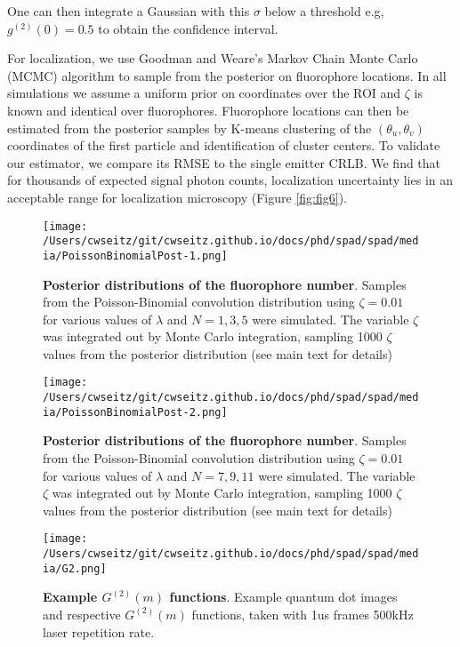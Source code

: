 One can then integrate a Gaussian with this $\sigma$ below a threshold e.g, $g^{(2)}(0)=0.5$ to obtain the confidence interval.

For localization, we use Goodman and Weare's Markov Chain Monte Carlo (MCMC) algorithm \parencite{Goodman2010} to sample from the posterior on fluorophore locations. In all simulations we assume a uniform prior on coordinates over the ROI and $\zeta$ is known and identical over fluorophores. Fluorophore locations can then be estimated from the posterior samples by K-means clustering of the $(\theta_u,\theta_v)$ coordinates of the first particle and identification of cluster centers. To validate our estimator, we compare its RMSE to the single emitter CRLB. We find that for thousands of expected signal photon counts, localization uncertainty lies in an acceptable range for localization microscopy (Figure \ref{fig:fig6}).

\begin{figure*}[t]
\centering
\texttt{[image: /Users/cwseitz/git/cwseitz.github.io/docs/phd/spad/spad/media/PoissonBinomialPost-1.png]}
\caption{\textbf{Posterior distributions of the fluorophore number}. Samples from the Poisson-Binomial convolution distribution using $\zeta=0.01$ for various values of $\lambda$ and $N=1,3,5$ were simulated. The variable $\zeta$ was integrated out by Monte Carlo integration, sampling 1000 $\zeta$ values from the posterior distribution (see main text for details)}
\label{fig:fig9}
\end{figure*}    

\begin{figure*}[t]
\centering
\texttt{[image: /Users/cwseitz/git/cwseitz.github.io/docs/phd/spad/spad/media/PoissonBinomialPost-2.png]}
\caption{\textbf{Posterior distributions of the fluorophore number}. Samples from the Poisson-Binomial convolution distribution using $\zeta=0.01$ for various values of $\lambda$ and $N=7,9,11$ were simulated. The variable $\zeta$ was integrated out by Monte Carlo integration, sampling 1000 $\zeta$ values from the posterior distribution (see main text for details)}
\label{fig:fig10}
\end{figure*}    

\begin{figure*}[t]
\centering
\texttt{[image: /Users/cwseitz/git/cwseitz.github.io/docs/phd/spad/spad/media/G2.png]}
\caption{\textbf{Example $G^{(2)}(m)$ functions}. Example quantum dot images and respective $G^{(2)}(m)$ functions, taken with 1us frames 500kHz laser repetition rate.}
\label{fig:fig32}
\end{figure*}    

